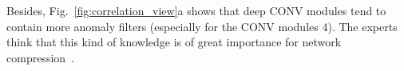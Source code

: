 \documentclass[format=acmsmall, review=false, screen=true]{acmart}
\begin{document}
\begin{figure}[htb]
\end{figure}%
Besides, Fig.~\ref{fig:correlation_view}a shows that deep CONV modules tend to contain more anomaly filters (especially for the CONV modules 4). The experts think that this kind of knowledge is of great importance for network compression~\cite{han2015deep}.
\end{document}
